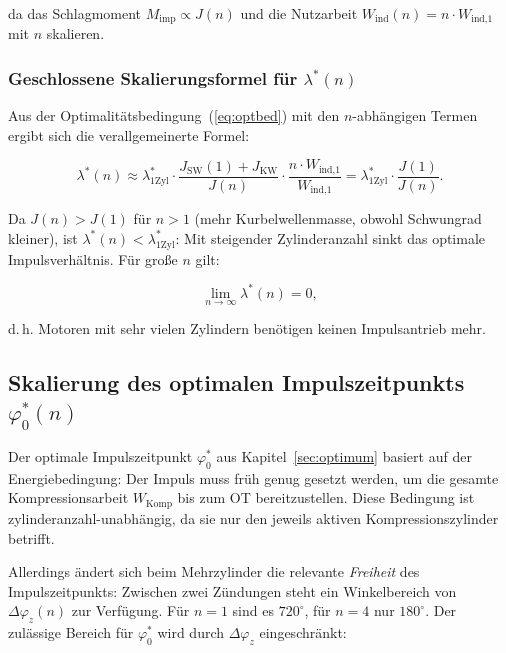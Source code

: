 ﻿\documentclass[a4paper,12pt]{article}
\begin{document}
\noindent
da das Schlagmoment $M_\text{imp} \propto J(n)$ und die Nutzarbeit
$W_\text{ind}(n) = n \cdot W_\text{ind,1}$ mit $n$ skalieren.

\subsubsection*{Geschlossene Skalierungsformel für $\lambda^*(n)$}

Aus der Optimalitätsbedingung~(\ref{eq:optbed}) mit den
$n$-abhängigen Termen ergibt sich die verallgemeinerte Formel:

\begin{equation}
  \boxed{
  \lambda^*(n) \approx \lambda^*_\text{1Zyl} \cdot
    \frac{J_\text{SW}(1) + J_\text{KW}}{J(n)} \cdot
    \frac{n \cdot W_\text{ind,1}}{W_\text{ind,1}}
  = \lambda^*_\text{1Zyl} \cdot \frac{J(1)}{J(n)}.
  }
  \label{eq:lambda_n}
\end{equation}

Da $J(n) > J(1)$ für $n>1$ (mehr Kurbelwellenmasse, obwohl Schwungrad
kleiner), ist $\lambda^*(n) < \lambda^*_\text{1Zyl}$: Mit steigender
Zylinderanzahl sinkt das optimale Impulsverhältnis. Für große $n$ gilt:

\begin{equation}
  \lim_{n \to \infty} \lambda^*(n) = 0,
  \label{eq:lambda_n_grenzwert}
\end{equation}

d.\,h. Motoren mit sehr vielen Zylindern benötigen keinen Impulsantrieb mehr.

\subsection{Skalierung des optimalen Impulszeitpunkts $\varphi_0^*(n)$}

Der optimale Impulszeitpunkt $\varphi_0^*$ aus Kapitel~\ref{sec:optimum}
basiert auf der Energiebedingung: Der Impuls muss früh genug gesetzt werden,
um die gesamte Kompressionsarbeit $W_\text{Komp}$ bis zum OT bereitzustellen.
Diese Bedingung ist zylinderanzahl-unabhängig, da sie nur den jeweils
aktiven Kompressionszylinder betrifft.

Allerdings ändert sich beim Mehrzylinder die relevante \textit{Freiheit}
des Impulszeitpunkts: Zwischen zwei Zündungen steht ein Winkelbereich
von $\Delta\varphi_z(n)$ zur Verfügung. Für $n=1$ sind es $720^\circ$,
für $n=4$ nur $180^\circ$. Der zulässige Bereich für $\varphi_0^*$
wird durch $\Delta\varphi_z$ eingeschränkt:
\end{document}
